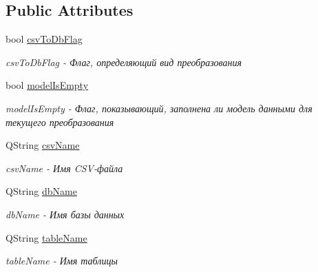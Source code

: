 \subsection*{Public Attributes}
\begin{DoxyCompactItemize}
\item 
bool \hyperlink{classMainWindow_a0c0162314418399bd62caeb93cd75850}{csv\+To\+Db\+Flag}\hypertarget{classMainWindow_a0c0162314418399bd62caeb93cd75850}{}\label{classMainWindow_a0c0162314418399bd62caeb93cd75850}

\begin{DoxyCompactList}\small\item\em csv\+To\+Db\+Flag -\/ Флаг, определяющий вид преобразования \end{DoxyCompactList}\item 
bool \hyperlink{classMainWindow_a8c53a3130d4c777634c39a85bd7787f0}{model\+Is\+Empty}\hypertarget{classMainWindow_a8c53a3130d4c777634c39a85bd7787f0}{}\label{classMainWindow_a8c53a3130d4c777634c39a85bd7787f0}

\begin{DoxyCompactList}\small\item\em model\+Is\+Empty -\/ Флаг, показывающий, заполнена ли модель данными для текущего преобразования \end{DoxyCompactList}\item 
Q\+String \hyperlink{classMainWindow_aed5e8f03fc9a624e6d7869e0cb49ef94}{csv\+Name}\hypertarget{classMainWindow_aed5e8f03fc9a624e6d7869e0cb49ef94}{}\label{classMainWindow_aed5e8f03fc9a624e6d7869e0cb49ef94}

\begin{DoxyCompactList}\small\item\em csv\+Name -\/ Имя C\+S\+V-\/файла \end{DoxyCompactList}\item 
Q\+String \hyperlink{classMainWindow_a5d38adc978b0e5b357ef202595bdde59}{db\+Name}\hypertarget{classMainWindow_a5d38adc978b0e5b357ef202595bdde59}{}\label{classMainWindow_a5d38adc978b0e5b357ef202595bdde59}

\begin{DoxyCompactList}\small\item\em db\+Name -\/ Имя базы данных \end{DoxyCompactList}\item 
Q\+String \hyperlink{classMainWindow_a706ef39943c2f4115bcc5c348270c7fe}{table\+Name}\hypertarget{classMainWindow_a706ef39943c2f4115bcc5c348270c7fe}{}\label{classMainWindow_a706ef39943c2f4115bcc5c348270c7fe}

\begin{DoxyCompactList}\small\item\em table\+Name -\/ Имя таблицы \end{DoxyCompactList}\end{DoxyCompactItemize}


